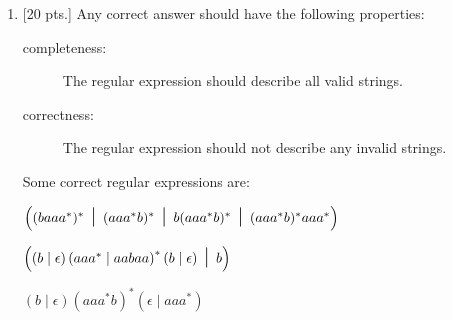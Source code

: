 \documentclass[11pt,fleqn]{article}
\begin{document}
  \begin{enumerate}

    \addtolength{\itemsep}{12mm}


    \item {[20 pts.]} Any correct answer should have the following
          properties:

          \vspace{-1.75mm}

          \begin{description}

            \item[completeness:] The regular expression should describe all
                  valid strings.

            \item[correctness:] The regular expression should not describe
                  any invalid strings.

          \end{description}

          \vspace{-1.75mm}

          Some correct regular expressions are:

          \vspace{-1.75mm}

          \begin{centering}

            \addtolength{\baselineskip}{2.5mm}  %

            \(
              \left(
                ( baaa^{*} )^{*}
                \mbox{\Large \ensuremath{\ \mid \ }}
                ( aaa^{*}b )^{*}
                \mbox{\Large \ensuremath{\ \mid \ }}
                b( aaa^{*}b )^{*}
                \mbox{\Large \ensuremath{\ \mid \ }}
                ( aaa^{*}b )^{*} aaa^{*}
              \right)
            \)

            \smallskip

            \(
              \left(
                ( b \mid \epsilon)
                \left(
                  aaa^{*} \mid aabaa
                \right)^{*}
                ( b \mid \epsilon)
              \mbox{\Large \ensuremath{\ \mid \ }}
                b
              \right)
            \)

            \smallskip

            \(
              ( b \mid \epsilon)
              ( aaa^{*}b )^{*}
              (\epsilon \mid aaa^{*})
            \)


\end{centering}
\end{enumerate}
\end{document}

